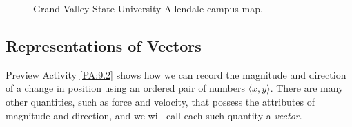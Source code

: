 \begin{figure}[ht]
\begin{center}
\end{center}
\caption{Grand Valley State University Allendale campus map.} 
\label{F:9.2.GVSU}
\end{figure}


\subsection*{Representations of Vectors}

Preview Activity \ref{PA:9.2} shows how we can record the magnitude
and direction of a change in position using an ordered pair of numbers
$\langle x,y\rangle$. There are many other quantities, such as force
and velocity, that possess the attributes of magnitude and direction,
and we will call each such quantity a {\em vector}.

